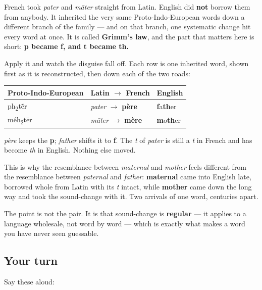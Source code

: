 \begin{grammarlens}[title={Grammar Lens: the same word went down two roads}]
French took \emph{pater} and \emph{māter} straight from Latin. English did \textbf{not} borrow them from anybody. It inherited the very same Proto-Indo-European words down a different branch of the family — and on that branch, one systematic change hit every word at once. It is called \textbf{Grimm's law}, and the part that matters here is short: \textbf{p became f, and t became th.}

Apply it and watch the disguise fall off. Each row is one inherited word, shown first as it is reconstructed, then down each of the two roads:

\noindent
\begin{tabularx}{\linewidth}{@{}>{\raggedright\arraybackslash}X>{\raggedright\arraybackslash}X>{\raggedright\arraybackslash}X@{}}
\toprule
\textbf{Proto-Indo-European} & \textbf{Latin $\to$ French} & \textbf{English} \\
\midrule
{*}ph\textsubscript{2}t\'{\={e}}r & \emph{pater} $\to$ \textbf{père} & \textbf{f}a\textbf{th}er \\
{*}méh\textsubscript{2}tēr & \emph{māter} $\to$ \textbf{mère} & \textbf{m}o\textbf{th}er \\
\bottomrule
\end{tabularx}

\emph{père} keeps the \textbf{p}; \emph{father} shifts it to \textbf{f}. The \emph{t} of \emph{pater} is still a \emph{t} in French and has become \emph{th} in English. Nothing else moved.

This is why the resemblance between \emph{maternal} and \emph{mother} feels different from the resemblance between \emph{paternal} and \emph{father}: \textbf{maternal} came into English late, borrowed whole from Latin with its \emph{t} intact, while \textbf{mother} came down the long way and took the sound-change with it. Two arrivals of one word, centuries apart.

The point is not the pair. It is that sound-change is \textbf{regular} — it applies to a language wholesale, not word by word — which is exactly what makes a word you have never seen guessable.
\end{grammarlens}

\subsection*{Your turn}
Say these aloud:

